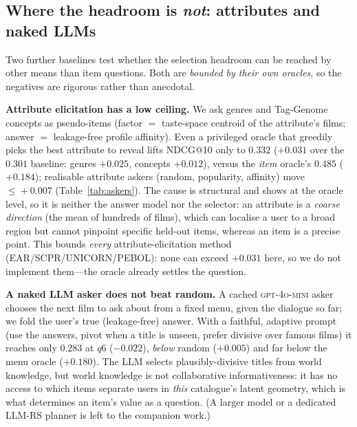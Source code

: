 \subsection{Where the headroom is \emph{not}: attributes and naked LLMs}\label{sec:notheadroom}
Two further baselines test whether the selection headroom can be reached by other means than item questions. Both are
\emph{bounded by their own oracles}, so the negatives are rigorous rather than anecdotal.

\textbf{Attribute elicitation has a low ceiling.} We ask genres and Tag-Genome concepts as pseudo-items (factor $=$
taste-space centroid of the attribute's films; answer $=$ leakage-free profile affinity). Even a privileged oracle
that greedily picks the best attribute to reveal lifts NDCG@10 only to $0.332$ ($+0.031$ over the $0.301$ baseline:
genres $+0.025$, concepts $+0.012$), versus the \emph{item} oracle's $0.485$ ($+0.184$); realisable attribute askers
(random, popularity, affinity) move $\le\!+0.007$ (Table~\ref{tab:askers}). The cause is structural and shows at the
oracle level, so it is neither the answer model nor the selector: an attribute is a \emph{coarse direction} (the mean
of hundreds of films), which can localise a user to a broad region but cannot pinpoint specific held-out items, whereas
an item is a precise point. This bounds \emph{every} attribute-elicitation method (EAR/SCPR/UNICORN/PEBOL): none can
exceed $+0.031$ here, so we do not implement them---the oracle already settles the question.

\textbf{A naked LLM asker does not beat random.} A cached \textsc{gpt-4o-mini} asker chooses the next film to ask about
from a fixed menu, given the dialogue so far; we fold the user's true (leakage-free) answer. With a faithful,
adaptive prompt (use the answers, pivot when a title is unseen, prefer divisive over famous films) it reaches only
$0.283$ at $q6$ ($-0.022$), \emph{below} random ($+0.005$) and far below the menu oracle ($+0.180$). The LLM selects
plausibly-divisive titles from world knowledge, but world knowledge is not collaborative informativeness: it has no
access to which items separate users in \emph{this} catalogue's latent geometry, which is what determines an item's
value as a question. (A larger model or a dedicated LLM-RS planner is left to the companion work.)

